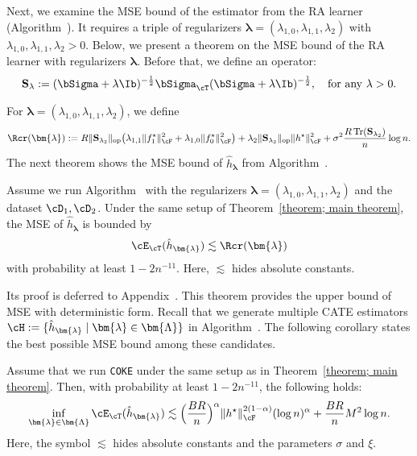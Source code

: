 \documentclass[12pt,a4paper,pdftex,onepage]{article}
\newcommand{\op}{\operatorname{op}}
\newcommand{\sig}{\sigma}
\newcommand{\Sbar}{\mathbf{S}}
\begin{document}
Next, we examine the MSE bound of the estimator from the RA learner (Algorithm~). 
It requires a triple of regularizers \(\bm{\lambda} = (\lambda_{1,0}, \lambda_{1,1}, \lambda_2)\) with \(\lambda_{1,0}, \lambda_{1,1}, \lambda_2 >0\). 
Below, we present a theorem on the MSE bound of the RA learner with regularizers \(\bm{\lambda}\). 
Before that, we define an operator:
\[
\Sbar_\lambda := (\bSigma + \lambda \Ib)^{-\frac{1}{2}} \bSigma_\cT (\bSigma + \lambda \Ib)^{-\frac{1}{2}}, 
\quad \text{for any } \lambda > 0.
\]

For \(\bm{\lambda} = (\lambda_{1,0}, \lambda_{1,1}, \lambda_2)\), we define
\[
\Rcr(\bm{\lambda}) 
:= 
R\|\Sbar_{\lambda_2}\|_{\op}\bigl(\lambda_{1,1}\|f^\star_1\|_{\cF}^2 + \lambda_{1,0}\|f^\star_0\|_{\cF}^2\bigr)
+
\lambda_{2}\|\Sbar_{\lambda_2}\|_{\op}\|h^\star\|_{\cF}^2
+
\sig^2 \frac{R\operatorname{Tr}(\Sbar_{\lambda_2})}{n}\log n.
\]
The next theorem shows the MSE bound of \(\hat{h}_{\bm{\lambda}}\) from Algorithm~.

\begin{theorem}\label{theorem; MSE bound RA learner}
Assume we run Algorithm~ with the regularizers \(\bm{\lambda} = (\lambda_{1,0}, \lambda_{1,1}, \lambda_2)\) and the dataset \(\cD_1, \cD_2\).
Under the same setup of Theorem~\ref{theorem; main theorem}, the MSE of \(\hat{h}_{\bm{\lambda}}\) is bounded by
\[
\cE_\cT(\hat{h}_{\bm{\lambda}}) \lesssim \Rcr(\bm{\lambda})
\]
with probability at least \(1-2n^{-11}\).
Here, \(\lesssim\) hides absolute constants.
\end{theorem}

Its proof is deferred to Appendix~. 
This theorem provides the upper bound of MSE with deterministic form.
Recall that we generate multiple CATE estimators \(\cH := \{\hat{h}_{\bm{\lambda}} \mid \bm{\lambda}\in \bm{\Lambda}\}\) in Algorithm~.
The following corollary states the best possible MSE bound among these candidates.

\begin{corollary}\label{corollary; optimal MSE bound}
Assume that we run \texttt{COKE} under the same setup as in Theorem~\ref{theorem; main theorem}. Then, with probability at least \(1-2n^{-11}\), the following holds:
\[
\inf_{\bm{\lambda} \in \bm{\Lambda}} \cE_\cT(\hat{h}_{\bm{\lambda}}) 
\lesssim  
\Bigl(\frac{BR}{n}\Bigr)^{\alpha}\|h^\star\|_{\cF}^{2(1-\alpha)}(\log n)^{\alpha}
+\frac{BR}{n} M^2\log n.
\]
Here, the symbol \(\lesssim\) hides absolute constants and the parameters \(\sigma\) and \(\xi\).



\end{corollary}
\end{document}
